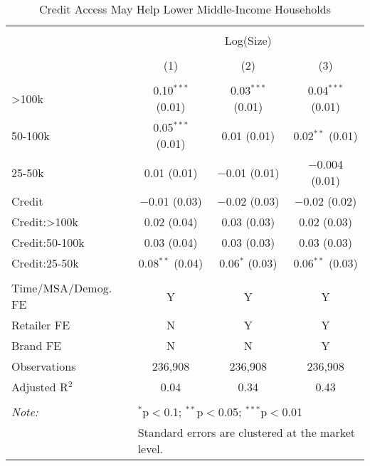 
\begin{table}[!htbp] \centering 
  \caption{Credit Access May Help Lower Middle-Income Households} 
  \label{tab:packageSizeFullTamponLiq} 
\begin{tabular}{@{\extracolsep{5pt}}lccc} 
\\[-1.8ex]\hline 
\hline \\[-1.8ex] 
 & \multicolumn{3}{c}{Log(Size)} \\ 
\\[-1.8ex] & (1) & (2) & (3)\\ 
\hline \\[-1.8ex] 
 >100k & 0.10$^{***}$ (0.01) & 0.03$^{***}$ (0.01) & 0.04$^{***}$ (0.01) \\ 
  50-100k & 0.05$^{***}$ (0.01) & 0.01 (0.01) & 0.02$^{**}$ (0.01) \\ 
  25-50k & 0.01 (0.01) & $-$0.01 (0.01) & $-$0.004 (0.01) \\ 
  Credit & $-$0.01 (0.03) & $-$0.02 (0.03) & $-$0.02 (0.02) \\ 
  Credit:>100k & 0.02 (0.04) & 0.03 (0.03) & 0.02 (0.03) \\ 
  Credit:50-100k & 0.03 (0.04) & 0.03 (0.03) & 0.03 (0.03) \\ 
  Credit:25-50k & 0.08$^{**}$ (0.04) & 0.06$^{*}$ (0.03) & 0.06$^{**}$ (0.03) \\ 
 \hline \\[-1.8ex] 
Time/MSA/Demog. FE & Y & Y & Y \\ 
Retailer FE & N & Y & Y \\ 
Brand FE & N & N & Y \\ 
Observations & 236,908 & 236,908 & 236,908 \\ 
Adjusted R$^{2}$ & 0.04 & 0.34 & 0.43 \\ 
\hline 
\hline \\[-1.8ex] 
\textit{Note:}  & \multicolumn{3}{l}{$^{*}$p$<$0.1; $^{**}$p$<$0.05; $^{***}$p$<$0.01} \\ 
 & \multicolumn{3}{l}{Standard errors are clustered at the market level.} \\ 
\end{tabular} 
\end{table} 
